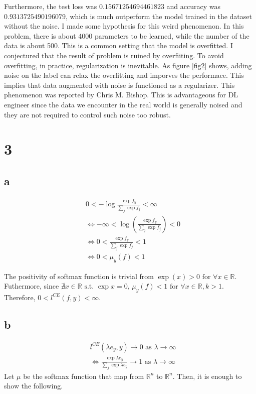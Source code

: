 \documentclass[10pt]{article}
\begin{document}
Furthermore, the test loss was $0.15671254694461823$ and accuracy was $0.9313725490196079$, which is much outperform the model trained in the dataset without the noise. 
I made some hypothesis for this weird phenomenon. In this problem, there is about 4000 parameters to be learned, while the number of the data is about 500.
This is a common setting that the model is overfitted. 
I conjectured that the result of problem is ruined by overfiiting. 
To avoid overfitting, in practice, regularization is inevitable.
As figure \ref{fig2} shows, adding noise on the label can relax the overfitting and imporves the performace. 
This implies that data augmented with noise is functioned as a regularizer. 
This phenomenon was reported by Chris M. Bishop\cite{bishop1995}.
This is advantageous for DL engineer since the data we encounter in the real world is generally noised and they are not required to control such noise too robust.


\section*{3}
\subsection*{a}
\begin{align*}
    &0<-\log{\frac{\exp{f_y}}{\sum_j \exp{f_j}}}<\infty\\
    & \iff -\infty < \log(\frac{\exp{f_y}}{\sum_j \exp{f_j}})<0 \\
    & \iff 0 < \frac{\exp{f_y}}{\sum_j \exp{f_j}} <1 \\
    & \iff 0 < \mu_y(f) < 1
\end{align*}

The positivity of softmax function is trivial from $\exp(x)>0 \text{ for } \forall x \in \mathbb{R}$. 
Futhermore, since $\nexists x\in \mathbb{R} \text{ s.t. } \exp{x} =  0$, $\mu_y(f) < 1 \text{ for } \forall x \in \mathbb{R}, k>1$.
Therefore, $0<l^{CE}(f,y)<\infty$.
\subsection*{b}

\begin{align*}
    &l^{CE}(\lambda e_y,y) \rightarrow 0 \text{ as } \lambda \rightarrow \infty \\
    &\iff \frac{\exp{\lambda e_y}}{\sum_j \exp{\lambda e_y}} \rightarrow 1 \text{ as } \lambda \rightarrow \infty
\end{align*}
Let $\mu$ be the softmax function that map from $\mathbb{R}^n$ to $\mathbb{R}^n$. Then, it is enough to show the following.
\end{document}
